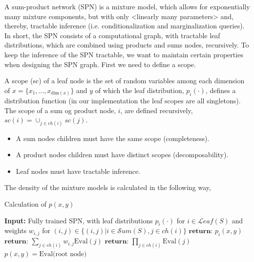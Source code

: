 A sum-product network (SPN) is a mixture model, which allows for exponentially many mixture
components, but with only <linearly many parameters> and, thereby, tractable inference (i.e.
conditionalization and marginalization queries). In short, the SPN consists of a computational
graph, with tractable leaf distributions, which are combined using products and sums nodes,
recursively. To keep the inference of the SPN tractable, we want to maintain certain properties when
designing the SPN graph. First we need to define a scope. 
\begin{testexample}
    A scope (sc) of a leaf node is the set of random variables among each dimension of $x = \{x_1,
    \dots, x_{\text{dim}(x)} \}$ and $y$ of which the leaf distribution,
    $p_i(\cdot)$, defines a distribution function (in our implementation the leaf scopes are all
    singletons). The scope of a sum og product node, $i$, are defined recursively, $sc(i) = \cup_{j \in
    ch(i)} sc(j)$. 
\end{testexample}

\begin{itemize}[noitemsep]
    \item A sum nodes children must have the same scope (completeness). 
    \item A product nodes children must have distinct scopes (decomposability).
    \item Leaf nodes must have tractable inference.
\end{itemize}


The density of the mixture models is calculated in the following way, 
\begin{algorithm}
    \caption*{Calculation of $p(x,y)$}\label{SPN_1}
    \begin{algorithmic}
    \State \textbf{Input:} Fully trained SPN, with leaf distributions $p_i(\cdot)$ for $i\in \mathcal{L}eaf(S)$ and weights 
    $w_{i,j}$ for $(i,j) \in \{(i,j)|i \in \mathcal{S}um(S), j \in ch(i)\}$ 
        \State  $\textbf{return: } p_i(x,y)$ 
    \EndIf
        \State $\textbf{return: } \sum_{j\in ch(i)} w_{i,j} \text{Eval}(j)$
    \EndIf
        \State $\textbf{return: } \prod_{j \in ch(i)} \text{Eval}(j)$
    \EndIf
    \EndFunction
    \State $p(x,y) =  \text{Eval(root node)}$
    \end{algorithmic}
\end{algorithm}

